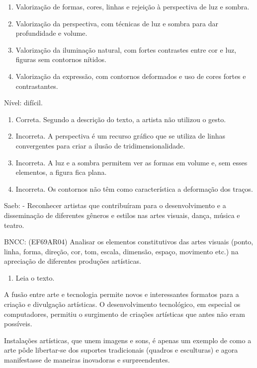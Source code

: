 \begin{escolha}
{{{{{{{{\begin{enumerate}
\def\labelenumi{\alph{enumi})}
\item
  Valorização de formas, cores, linhas e rejeição à perspectiva de luz e
  sombra.
\item
  Valorização da perspectiva, com técnicas de luz e sombra para dar
  profundidade e volume.
\item
  Valorização da iluminação natural, com fortes contrastes entre cor e
  luz, figuras sem contornos nítidos.
\item
  Valorização da expressão, com contornos deformados e uso de cores
  fortes e contrastantes.
\end{enumerate}

Nível: difícil.

\begin{enumerate}
\def\labelenumi{\alph{enumi})}
\item
  Correta. Segundo a descrição do texto, a artista não utilizou o gesto.
\item
  Incorreta. A perspectiva é um recurso gráfico que se utiliza de linhas
  convergentes para criar a ilusão de tridimensionalidade.
\item
  Incorreta. A luz e a sombra permitem ver as formas em volume e, sem
  esses elementos, a figura fica plana. ~
\item
  Incorreta. Os contornos não têm como característica a deformação dos
  traços.
\end{enumerate}

Saeb: - Reconhecer artistas que contribuíram para o desenvolvimento e a
disseminação de diferentes gêneros e estilos nas artes visuais, dança,
música e teatro.

BNCC: (EF69AR04) Analisar os elementos constitutivos das artes visuais
(ponto, linha, forma, direção, cor, tom, escala, dimensão, espaço,
movimento etc.) na apreciação de diferentes produções artísticas.

\begin{enumerate}
\def\labelenumi{\arabic{enumi}.}
\item
  Leia o texto.
\end{enumerate}

A fusão entre arte e tecnologia permite novos e interessantes formatos
para a criação e divulgação artísticas. O desenvolvimento tecnológico,
em especial os computadores, permitiu o surgimento de criações
artísticas que antes não eram possíveis.

Instalações artísticas, que unem imagens e sons, é apenas um exemplo de
como a arte pôde libertar-se dos suportes tradicionais (quadros e
esculturas) e agora manifestasse de maneiras inovadoras e
surpreendentes.

}}}}}}}}
\end{escolha}
